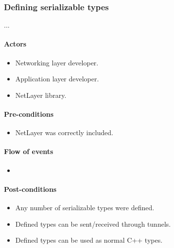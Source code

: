 \documentclass[12pt]{report}
\begin{document}
                \subsubsection{Defining serializable types}
                    ...
                    \paragraph{Actors}
                        \begin{itemize}
                            \item Networking layer developer.
                            \item Application layer developer.
                            \item NetLayer library.
                        \end{itemize}

                    \paragraph{Pre-conditions}
                        \begin{itemize}
                            \item NetLayer was correctly included.
                        \end{itemize}

                    \paragraph{Flow of events}
                        \begin{itemize}
                            \item
                        \end{itemize}

                    \paragraph{Post-conditions}
                        \begin{itemize}
                            \item Any number of serializable types were defined.
                            \item Defined types can be sent/received through tunnels.
                            \item Defined types can be used as normal C++ types.
                        \end{itemize}
\end{document}
